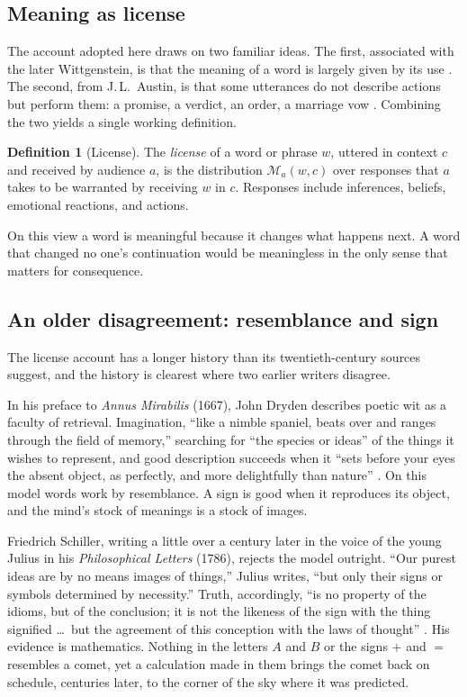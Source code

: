 \documentclass[11pt,a4paper]{article}
\theoremstyle{plain}
\theoremstyle{definition}
\newtheorem{definition}{Definition}
\theoremstyle{remark}
\newcommand{\M}{\mathcal{M}}
\begin{document}
\subsection{Meaning as license}

The account adopted here draws on two familiar ideas. The first, associated with the later Wittgenstein, is that the meaning of a word is largely given by its use \cite{wittgenstein1953}. The second, from J.\,L.\ Austin, is that some utterances do not describe actions but perform them: a promise, a verdict, an order, a marriage vow \cite{austin1962}. Combining the two yields a single working definition.

\begin{definition}[License]
The \emph{license} of a word or phrase $w$, uttered in context $c$ and received by audience $a$, is the distribution $\M_a(w,c)$ over responses that $a$ takes to be warranted by receiving $w$ in $c$. Responses include inferences, beliefs, emotional reactions, and actions.
\end{definition}

On this view a word is meaningful because it changes what happens next. A word that changed no one's continuation would be meaningless in the only sense that matters for consequence.

\subsection{An older disagreement: resemblance and sign}

The license account has a longer history than its twentieth-century sources suggest, and the history is clearest where two earlier writers disagree.

In his preface to \emph{Annus Mirabilis} (1667), John Dryden describes poetic wit as a faculty of retrieval. Imagination, ``like a nimble spaniel, beats over and ranges through the field of memory,'' searching for ``the species or ideas'' of the things it wishes to represent, and good description succeeds when it ``sets before your eyes the absent object, as perfectly, and more delightfully than nature'' \cite{dryden1667}. On this model words work by resemblance. A sign is good when it reproduces its object, and the mind's stock of meanings is a stock of images.

Friedrich Schiller, writing a little over a century later in the voice of the young Julius in his \emph{Philosophical Letters} (1786), rejects the model outright. ``Our purest ideas are by no means images of things,'' Julius writes, ``but only their signs or symbols determined by necessity.'' Truth, accordingly, ``is no property of the idioms, but of the conclusion; it is not the likeness of the sign with the thing signified \ldots\ but the agreement of this conception with the laws of thought'' \cite{schiller1786}. His evidence is mathematics. Nothing in the letters $A$ and $B$ or the signs $+$ and $=$ resembles a comet, yet a calculation made in them brings the comet back on schedule, centuries later, to the corner of the sky where it was predicted.
\end{document}
